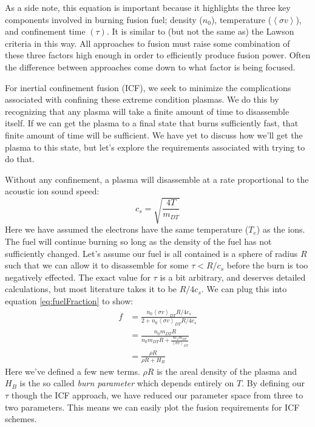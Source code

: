 As a side note, this equation is important because it highlights the three key components involved in burning fusion fuel; density ($n_0$), temperature ($\left<\sigma v\right>$), and confinement time $(\tau)$. It is similar to (but not the same as) the Lawson criteria in this way. All approaches to fusion must raise some combination of these three factors high enough in order to efficiently produce fusion power. Often the difference between approaches come down to what factor is being focused.

For inertial confinement fusion (ICF), we seek to minimize the complications associated with confining these extreme condition plasmas. We do this by recognizing that any plasma will take a finite amount of time to disassemble itself. If we can get the plasma to a final state that burns sufficiently fast, that finite amount of time will be sufficient. We have yet to discuss how we'll get the plasma to this state, but let's explore the requirements associated with trying to do that.

Without any confinement, a plasma will disassemble at a rate proportional to the acoustic ion sound speed:
%
\begin{equation}
	c_s = \sqrt{\frac{4T}{m_{DT}}}
\end{equation}
%
Here we have assumed the electrons have the same temperature ($T_e$) as the ions. The fuel will continue burning so long as the density of the fuel has not sufficiently changed. Let's assume our fuel is all contained is a sphere of radius $R$ such that we can allow it to disassemble for some $\tau< R/c_s$ before the burn is too negatively effected. The exact value for $\tau$ is a bit arbitrary, and deserves detailed calculations, but most literature takes it to be $R/4c_s$. We can plug this into equation \ref{eq:fuelFraction} to show:
%
\begin{equation}
	\begin{split}
		f &= \frac{n_0\left<\sigma v\right>_{DT} R / 4c_s}{2 + n_0\left<\sigma v\right>_{DT} R / 4c_s} \\
		& = \frac{n_0m_{DT}R}{n_0m_{DT}R + \frac{8 c_s m_{DT}}{\left<\sigma v\right>_{DT}}}\\
		&= \frac{\rho R}{\rho R + H_B}
	\end{split}
	\label{eq:burnFraction}
\end{equation}
%
Here we've defined a few new terms. $\rho R$ is the areal density of the plasma and $H_B$ is the so called \emph{burn parameter} which depends entirely on $T$. By defining our $\tau$ though the ICF approach, we have reduced our parameter space from three to two parameters. This means we can easily plot the fusion requirements for ICF schemes. 

